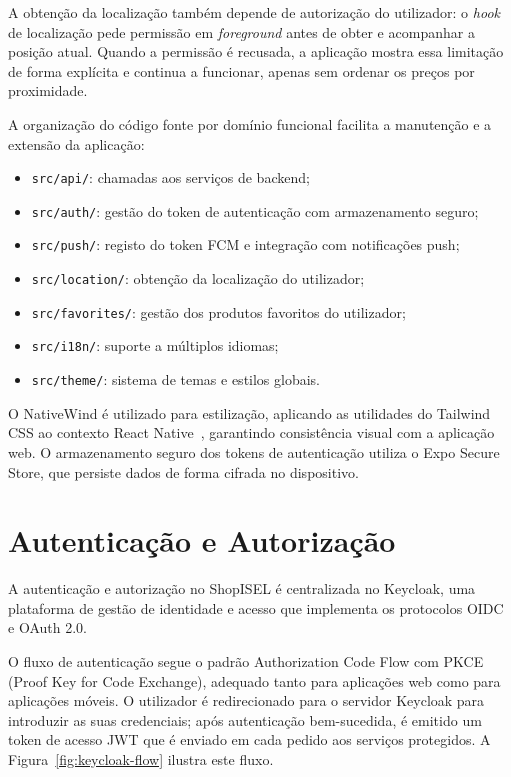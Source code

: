 A obtenção da localização também depende de autorização do utilizador: o \textit{hook} de localização pede permissão em \textit{foreground} antes de obter e acompanhar a posição atual. Quando a permissão é recusada, a aplicação mostra essa limitação de forma explícita e continua a funcionar, apenas sem ordenar os preços por proximidade.

A organização do código fonte por domínio funcional facilita a manutenção e a extensão da aplicação:
\begin{itemize}
    \item \texttt{src/api/}: chamadas aos serviços de backend;
    \item \texttt{src/auth/}: gestão do token de autenticação com armazenamento seguro;
    \item \texttt{src/push/}: registo do token FCM e integração com notificações push;
    \item \texttt{src/location/}: obtenção da localização do utilizador;
    \item \texttt{src/favorites/}: gestão dos produtos favoritos do utilizador;
    \item \texttt{src/i18n/}: suporte a múltiplos idiomas;
    \item \texttt{src/theme/}: sistema de temas e estilos globais.
\end{itemize}

O NativeWind é utilizado para estilização, aplicando as utilidades do Tailwind CSS ao contexto React Native~\cite{nativewind-docs}, garantindo consistência visual com a aplicação web. O armazenamento seguro dos tokens de autenticação utiliza o Expo Secure Store, que persiste dados de forma cifrada no dispositivo.

\section{Autenticação e Autorização}
\label{sec:4.7}

A autenticação e autorização no ShopISEL é centralizada no Keycloak, uma plataforma de gestão de identidade e acesso que implementa os protocolos \ac{OIDC} e OAuth 2.0.

O fluxo de autenticação segue o padrão Authorization Code Flow com PKCE (Proof Key for Code Exchange), adequado tanto para aplicações web como para aplicações móveis. O utilizador é redirecionado para o servidor Keycloak para introduzir as suas credenciais; após autenticação bem-sucedida, é emitido um token de acesso \ac{JWT} que é enviado em cada pedido aos serviços protegidos. A Figura~\ref{fig:keycloak-flow} ilustra este fluxo.

